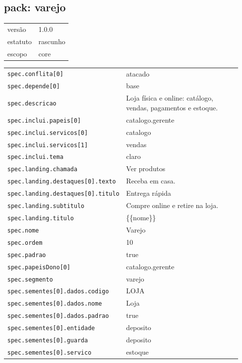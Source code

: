 \subsection*{pack: varejo}
\begin{tabular}{@{}ll@{}}
versão & 1.0.0 \\
estatuto & rascunho \\
escopo & core \\
\end{tabular}

\begin{tabular}{@{}p{0.35\linewidth}p{0.6\linewidth}@{}}
\texttt{spec.conflita[0]} & atacado \\
\texttt{spec.depende[0]} & base \\
\texttt{spec.descricao} & Loja física e online: catálogo, vendas, pagamentos e estoque. \\
\texttt{spec.inclui.papeis[0]} & catalogo.gerente \\
\texttt{spec.inclui.servicos[0]} & catalogo \\
\texttt{spec.inclui.servicos[1]} & vendas \\
\texttt{spec.inclui.tema} & claro \\
\texttt{spec.landing.chamada} & Ver produtos \\
\texttt{spec.landing.destaques[0].texto} & Receba em casa. \\
\texttt{spec.landing.destaques[0].titulo} & Entrega rápida \\
\texttt{spec.landing.subtitulo} & Compre online e retire na loja. \\
\texttt{spec.landing.titulo} & \{\{nome\}\} \\
\texttt{spec.nome} & Varejo \\
\texttt{spec.ordem} & 10 \\
\texttt{spec.padrao} & true \\
\texttt{spec.papeisDono[0]} & catalogo.gerente \\
\texttt{spec.segmento} & varejo \\
\texttt{spec.sementes[0].dados.codigo} & LOJA \\
\texttt{spec.sementes[0].dados.nome} & Loja \\
\texttt{spec.sementes[0].dados.padrao} & true \\
\texttt{spec.sementes[0].entidade} & deposito \\
\texttt{spec.sementes[0].guarda} & deposito \\
\texttt{spec.sementes[0].servico} & estoque \\
\end{tabular}
